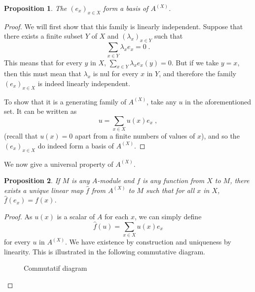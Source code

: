 \documentclass{report}
\newtheorem{prop}{Proposition}
\theoremstyle{definition}
\theoremstyle{remark}
\begin{document}
\begin{prop}
    The $(e_x)_{x\in X}$ form a basis of $A^{(X)}$. 
\end{prop}


\begin{proof}
    We will first show that this family is linearly independent. Suppose that there exists a finite subset $Y$ of $X$ and $(\lambda_x)_{x\in Y}$ such that $$\sum_{x\in Y} \lambda_x e_x = 0\;.$$ This means that for every $y$ in $X$, $\sum_{x\in Y} \lambda_x e_x(y) = 0$. But if we take $y=x$, then this must mean that $\lambda_x$ is nul for every $x$ in $Y$, and therefore the family $(e_x)_{x\in X}$ is indeed linearly independent. 
    
    To show that it is a generating family of $A^{(X)}$, take any $u$ in the aforementioned set. It can be written as $$ u = \sum_{x\in X} u(x) e_x\;,$$
    (recall that $u(x)=0$ apart from a finite numbers of values of $x$), and so the $(e_x)_{x\in X}$ do indeed form a basis of $A^{(X)}$.
\end{proof}
  
  We now give a universal property of $A^{(X)}$.
  
 
  
 \begin{prop}
     If $M$ is any $A$-module and $f$ is any function from $X$ to $M$, there exists a unique linear map $\hat{f}$ from $A^{(X)}$ to $M$ such that for all $x$ in $X$, $\hat{f}(e_x) = f(x)$. 
 \end{prop}
 
\begin{proof}
    As $u(x)$ is a scalar of $A$ for each $x$, we can simply define $$\hat{f}(u) = \sum_{x\in X} u(x)e_x $$ for every $u$ in $A^{(X)}$. We have existence by construction and uniqueness by linearity. This is illustrated in the following commutative diagram. 
    
     \begin{figure} [h!]
\begin{center}
\end{center}
\caption{\label{fig:diacom1}Commutatif diagram}
\end{figure}

\end{proof}
\end{document}
